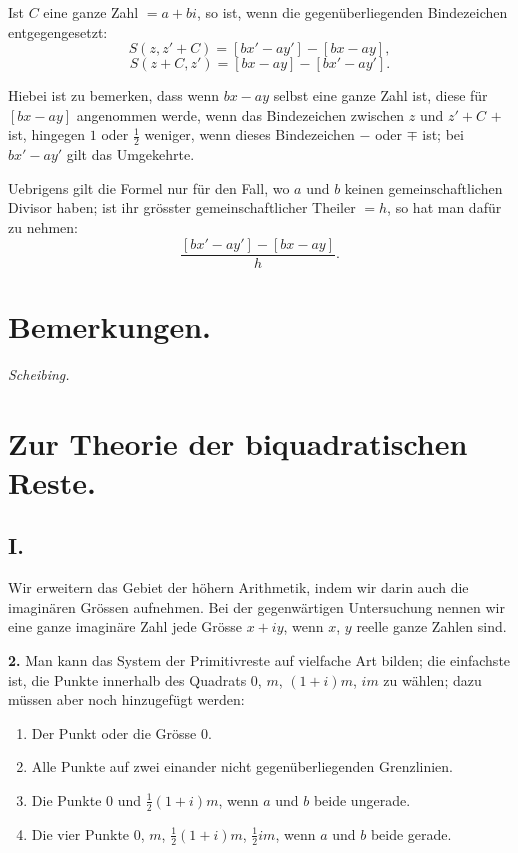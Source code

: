 \documentclass[12pt,a4paper]{article}
\begin{document}
Ist $C$ eine ganze Zahl $= a + bi$, so ist, wenn die gegenüberliegenden Bindezeichen entgegengesetzt:
\[
S(z, z' + C) = [bx' - ay'] - [bx - ay],
\]
\[
S(z + C, z') = [bx - ay] - [bx' - ay'].
\]

Hiebei ist zu bemerken, dass wenn $bx - ay$ selbst eine ganze Zahl ist, diese für $[bx - ay]$
angenommen werde, wenn das Bindezeichen zwischen $z$ und $z' + C$ $+$ ist, hingegen $1$ oder
$\frac{1}{2}$ weniger, wenn dieses Bindezeichen $-$ oder $\mp$ ist; bei $bx' - ay'$ gilt das Umgekehrte.

Uebrigens gilt die Formel nur für den Fall, wo $a$ und $b$ keinen gemeinschaftlichen Divisor haben;
ist ihr grösster gemeinschaftlicher Theiler $= h$, so hat man dafür zu nehmen:
\[
\frac{[bx' - ay'] - [bx - ay]}{h}.
\]

\newpage


\section*{Bemerkungen.}

\textit{Scheibing.}

\newpage


\section*{Zur Theorie der biquadratischen Reste.}

\subsection*{I.}

Wir erweitern das Gebiet der höhern Arithmetik, indem wir darin auch die imaginären Grössen
aufnehmen. Bei der gegenwärtigen Untersuchung nennen wir eine ganze imaginäre Zahl jede Grösse
$x + iy$, wenn $x$, $y$ reelle ganze Zahlen sind.

\textbf{2.} Man kann das System der Primitivreste auf vielfache Art bilden; die einfachste ist, die
Punkte innerhalb des Quadrats $0$, $m$, $(1 + i)m$, $im$ zu wählen; dazu müssen aber noch
hinzugefügt werden:
\begin{enumerate}[label=\Roman*.]
\item Der Punkt oder die Grösse $0$.
\item Alle Punkte auf zwei einander nicht gegenüberliegenden Grenzlinien.
\item Die Punkte $0$ und $\frac{1}{2}(1 + i)m$, wenn $a$ und $b$ beide ungerade.
\item Die vier Punkte $0$, $m$, $\frac{1}{2}(1 + i)m$, $\frac{1}{2}im$, wenn $a$ und $b$ beide gerade.
\end{enumerate}
\end{document}

